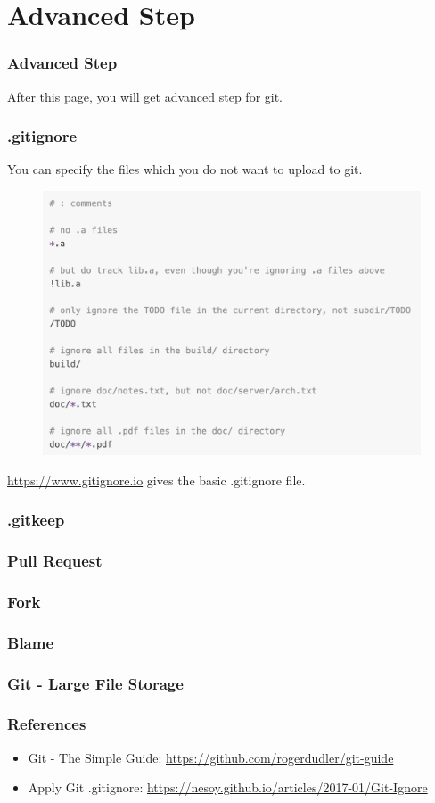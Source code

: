 \documentclass[aspectratio=169]{beamer}
\begin{document}
	\section{Advanced Step}
	\begin{frame}
		\frametitle{Advanced Step}
		After this page, you will get advanced step for git. 
	\end{frame}

	\begin{frame}
		\frametitle{.gitignore}
		You can specify the files which you do not want to upload to git.
		\begin{figure}
			\centering
			\includegraphics[width=0.4 \linewidth]{figures/gitignore.png}
		\end{figure}
		\url{https://www.gitignore.io} gives the basic .gitignore file.
	\end{frame}

	\begin{frame}
		\frametitle{.gitkeep}
	\end{frame}

	\begin{frame}
		\frametitle{Pull Request}
	\end{frame}

	\begin{frame}
		\frametitle{Fork}
	\end{frame}

	\begin{frame}
		\frametitle{Blame}
	\end{frame}

	\begin{frame}
		\frametitle{Git - Large File Storage}
	\end{frame}

	\begin{frame}
		\frametitle{References}
		
		\begin{itemize}
			\item Git - The Simple Guide: \url{https://github.com/rogerdudler/git-guide}
			\item Apply Git .gitignore: \url{https://nesoy.github.io/articles/2017-01/Git-Ignore}
		\end{itemize}
	\end{frame}
\end{document}
